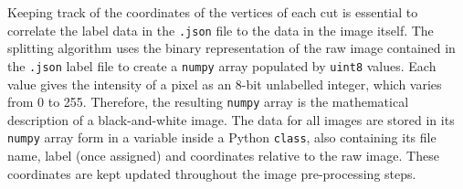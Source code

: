 Keeping track of the coordinates of the vertices of each cut is essential to correlate the label data in the \texttt{.json} file to the data in the image itself. The splitting algorithm uses the binary representation of the raw image contained in the \texttt{.json} label file to create a \texttt{numpy} \cite{Harris2020, numpy} array populated by \texttt{uint8} values. Each value gives the intensity of a pixel as an 8-bit unlabelled integer, which varies from \num{0} to \num{255}. Therefore, the resulting \texttt{numpy} array is the mathematical description of a black-and-white image. The data for all images are stored in its \texttt{numpy} array form in a variable inside a Python \texttt{class}, also containing its file name, label (once assigned) and coordinates relative to the raw image. These coordinates are kept updated throughout the image pre-processing steps.


